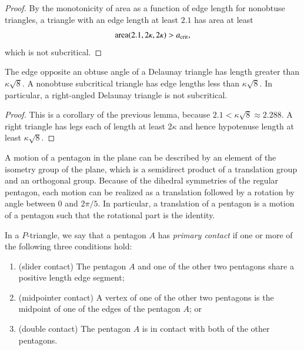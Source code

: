 \begin{proof} By the monotonicity of area as a function of edge length
  for nonobtuse triangles, a triangle with an edge length at least
  $2.1$ has area at least
\[
{\operatorname{area}}(2.1,2\kappa,2\kappa) > a_\text{crit},
\] %
which is not subcritical.
\end{proof}

\begin{lemma}
  The edge opposite an obtuse angle of a Delaunay triangle has length greater than $\kappa\sqrt8$.
  A nonobtuse subcritical triangle has edge lengths less than
  $\kappa\sqrt8$.  In particular, a right-angled Delaunay triangle is
  not subcritical.
\end{lemma}

\begin{proof}  
  This is a corollary of the previous lemma, because $2.1 <
  \kappa\sqrt8 \approx 2.288$.
  A right triangle has legs each of length at least $2\kappa$ and hence
  hypotenuse length at least $\kappa\sqrt8$.
\end{proof}

\begin{remark}
  A motion of a pentagon in the plane can be described by an element
  of the isometry group of the plane, which is a semidirect product of
  a translation group and an orthogonal group.  Because of the
  dihedral symmetries of the regular pentagon, each motion can be
  realized as a translation followed by a rotation by angle between
  $0$ and $2\pi/5$.  In particular, a translation of a pentagon is a
  motion of a pentagon such that the rotational part is the identity.
\end{remark}

\begin{definition}
In a $P$-triangle, we say that a pentagon $A$ has {\it primary
  contact} if one or more of the following three conditions hold:
\begin{enumerate}
\item (slider contact) The pentagon $A$ and one of the other two pentagons
   share a positive length edge segment;
\item (midpointer contact) A vertex of one of the other two pentagons
  is the midpoint of one of the edges of the pentagon $A$; or
\item (double contact) The pentagon $A$ is in contact with both of the
  other pentagons.
\end{enumerate}
\end{definition}

